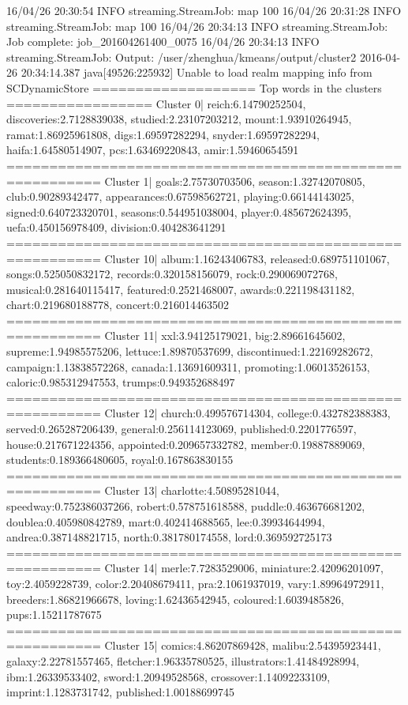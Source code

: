 16/04/26 20:30:54 INFO streaming.StreamJob:  map 100%
16/04/26 20:31:28 INFO streaming.StreamJob:  map 100%
16/04/26 20:34:13 INFO streaming.StreamJob: Job complete: job_201604261400_0075
16/04/26 20:34:13 INFO streaming.StreamJob: Output: /user/zhenghua/kmeans/output/cluster2
2016-04-26 20:34:14.387 java[49526:225932] Unable to load realm mapping info from SCDynamicStore
=================== Top words in the clusters ================= 
Cluster 0| reich:6.14790252504, discoveries:2.7128839038, studied:2.23107203212, mount:1.93910264945, ramat:1.86925961808, digs:1.69597282294, snyder:1.69597282294, haifa:1.64580514907, pcs:1.63469220843, amir:1.59460654591
========================================================= 
Cluster 1| goals:2.75730703506, season:1.32742070805, club:0.90289342477, appearances:0.67598562721, playing:0.66144143025, signed:0.640723320701, seasons:0.544951038004, player:0.485672624395, uefa:0.450156978409, division:0.404283641291
========================================================= 
Cluster 10| album:1.16243406783, released:0.689751101067, songs:0.525050832172, records:0.320158156079, rock:0.290069072768, musical:0.281640115417, featured:0.2521468007, awards:0.221198431182, chart:0.219680188778, concert:0.216014463502
========================================================= 
Cluster 11| xxl:3.94125179021, big:2.89661645602, supreme:1.94985575206, lettuce:1.89870537699, discontinued:1.22169282672, campaign:1.13838572268, canada:1.13691609311, promoting:1.06013526153, caloric:0.985312947553, trumps:0.949352688497
========================================================= 
Cluster 12| church:0.499576714304, college:0.432782388383, served:0.265287206439, general:0.256114123069, published:0.2201776597, house:0.217671224356, appointed:0.209657332782, member:0.19887889069, students:0.189366480605, royal:0.167863830155
========================================================= 
Cluster 13| charlotte:4.50895281044, speedway:0.752386037266, robert:0.578751618588, puddle:0.463676681202, doublea:0.405980842789, mart:0.402414688565, lee:0.39934644994, andrea:0.387148821715, north:0.381780174558, lord:0.369592725173
========================================================= 
Cluster 14| merle:7.7283529006, miniature:2.42096201097, toy:2.4059228739, color:2.20408679411, pra:2.1061937019, vary:1.89964972911, breeders:1.86821966678, loving:1.62436542945, coloured:1.6039485826, pups:1.15211787675
========================================================= 
Cluster 15| comics:4.86207869428, malibu:2.54395923441, galaxy:2.22781557465, fletcher:1.96335780525, illustrators:1.41484928994, ibm:1.26339533402, sword:1.20949528568, crossover:1.14092233109, imprint:1.1283731742, published:1.00188699745
